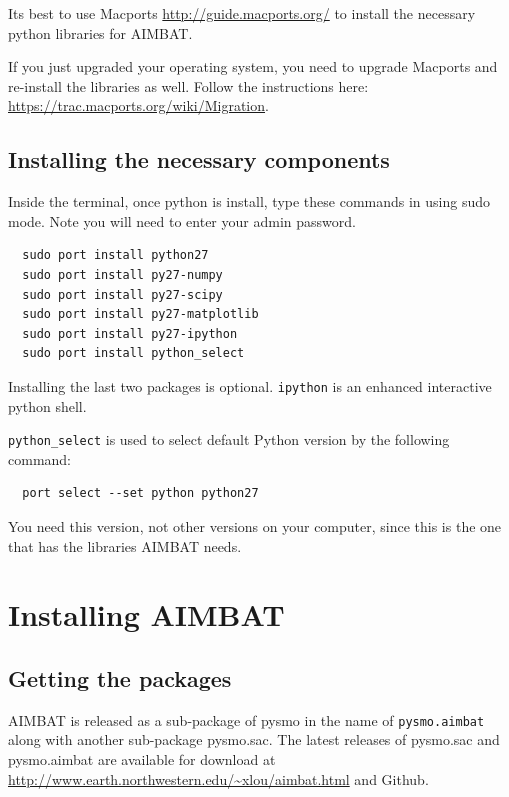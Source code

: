 \documentclass[letterpaper,10pt]{article}
\begin{document}
Its best to use Macports \url{http://guide.macports.org/} to install the necessary python libraries for AIMBAT. 

If you just upgraded your operating system, you need to upgrade Macports and re-install the libraries as well. Follow the instructions here: \url{https://trac.macports.org/wiki/Migration}.

\subsection{Installing the necessary components}

Inside the terminal, once python is install, type these commands in using sudo mode. Note you will need to enter your admin password.

\begin{verbatim}
  sudo port install python27
  sudo port install py27-numpy
  sudo port install py27-scipy
  sudo port install py27-matplotlib
  sudo port install py27-ipython
  sudo port install python_select
\end{verbatim}

Installing the last two packages is optional. \verb"ipython" is an enhanced interactive python shell.

\verb"python_select" is used to select default Python version by the following command:

\begin{verbatim}
  port select --set python python27
\end{verbatim}

You need this version, not other versions on your computer, since this is the one that has the libraries AIMBAT needs.


\section{Installing AIMBAT}

\subsection{Getting the packages}

AIMBAT is released as a sub-package of pysmo in the name of \verb"pysmo.aimbat" along with
another sub-package pysmo.sac. The latest releases of pysmo.sac and pysmo.aimbat are
available for download at \url{http://www.earth.northwestern.edu/~xlou/aimbat.html} and Github. 
\end{document}
